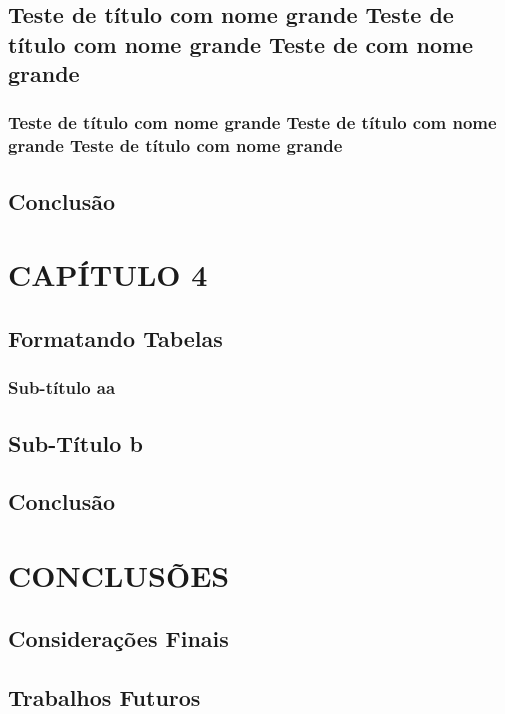 \documentclass[pnumromarab, normaltoc, a4paper, 12pt]{abnt-unochapeco}
\begin{document}
\section{Teste de título com nome grande Teste de título com nome grande Teste
de com nome grande}
\subsection{Teste de título com nome grande Teste de título com nome grande
Teste de título com nome grande}
\section{Conclusão}
\chapter{CAPÍTULO 4}
\section{Formatando Tabelas}
\subsection{Sub-título aa}
\section{Sub-Título b}
\section{Conclusão}
\chapter{CONCLUSÕES}
\section{Considerações Finais}
\section{Trabalhos Futuros}
\end{document}
